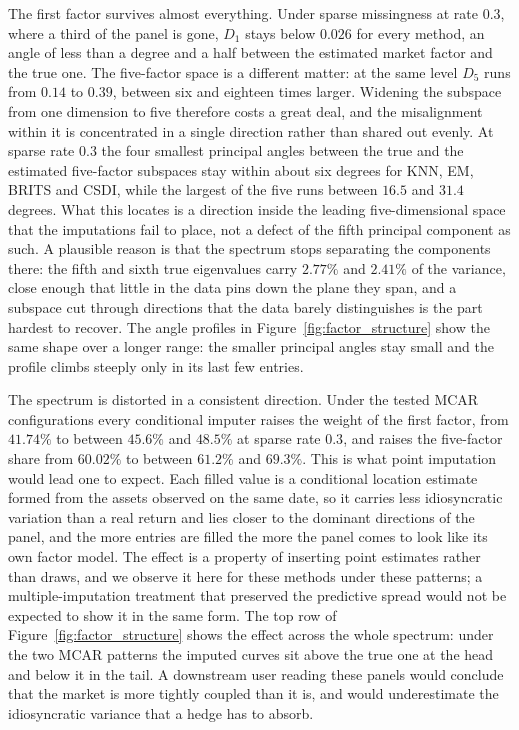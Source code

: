 The first factor survives almost everything. Under sparse missingness at rate
$0.3$, where a third of the panel is gone, $D_1$ stays below $0.026$ for every
method, an angle of less than a degree and a half between the estimated market
factor and the true one. The five-factor space is a different matter: at the
same level $D_5$ runs from $0.14$ to $0.39$, between six and eighteen times
larger. Widening the subspace from one dimension to five therefore costs a great
deal, and the misalignment within it is concentrated in a single direction rather
than shared out evenly. At sparse rate $0.3$ the four smallest principal angles
between the true and the estimated five-factor subspaces stay within about six
degrees for KNN, EM, BRITS and CSDI, while the largest of the five runs between
$16.5$ and $31.4$ degrees. What this locates is a direction inside the leading
five-dimensional space that the imputations fail to place, not a defect of the
fifth principal component as such. A plausible reason is that the spectrum stops
separating the components there: the fifth and sixth true eigenvalues carry
$2.77\%$ and $2.41\%$ of the variance, close enough that little in the data
pins down the plane they span, and a subspace cut through directions that the
data barely distinguishes is the part hardest to recover. The angle profiles in
Figure~\ref{fig:factor_structure} show the same shape over a longer range: the
smaller principal angles stay small and the profile climbs steeply only in its
last few entries.

The spectrum is distorted in a consistent direction. Under the tested MCAR
configurations every conditional imputer raises the weight of the first factor,
from $41.74\%$ to between $45.6\%$ and $48.5\%$ at sparse rate $0.3$, and raises
the five-factor share from $60.02\%$ to between $61.2\%$ and $69.3\%$. This is
what point imputation would lead one to expect. Each filled value is a
conditional location estimate formed from the assets observed on the same date,
so it carries less idiosyncratic variation than a real return and lies closer to
the dominant directions of the panel, and the more entries are filled the more
the panel comes to look like its own factor model. The effect is a property of
inserting point estimates rather than draws, and we observe it here for these
methods under these patterns; a multiple-imputation treatment that preserved the
predictive spread would not be expected to show it in the same form. The top row of
Figure~\ref{fig:factor_structure} shows the effect across the whole spectrum:
under the two MCAR patterns the imputed curves sit above the true one at the
head and below it in the tail. A downstream user reading these panels would
conclude that the market is more tightly coupled than it is, and would
underestimate the idiosyncratic variance that a hedge has to absorb.

